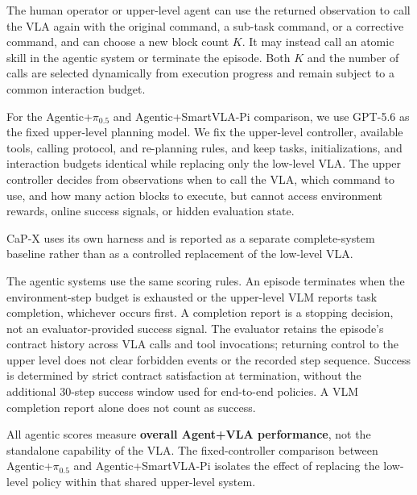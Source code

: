 The human operator or upper-level agent can use the returned observation
to call the VLA again with the original command, a sub-task command, or
a corrective command, and can choose a new block count \(K\). It may
instead call an atomic skill in the agentic system or terminate the
episode. Both \(K\) and the number of calls are selected dynamically
from execution progress and remain subject to a common interaction
budget.

For the Agentic+$\pi_{0.5}$ and Agentic+SmartVLA-Pi comparison, we use GPT-5.6
as the fixed upper-level planning model. We fix the upper-level
controller, available tools, calling protocol, and re-planning rules, and
keep tasks, initializations, and interaction budgets identical while
replacing only the low-level VLA. The upper controller decides from
observations when to call the VLA, which command to use, and how many
action blocks to execute, but cannot access environment rewards, online
success signals, or hidden evaluation state.

CaP-X uses its own harness and is reported as a separate complete-system
baseline rather than as a controlled replacement of the low-level VLA.

The agentic systems use the same scoring rules. An episode terminates when
the environment-step budget is exhausted or the upper-level VLM reports
task completion, whichever occurs first. A completion report is a stopping
decision, not an evaluator-provided success signal. The evaluator retains
the episode's contract history across VLA calls and tool invocations;
returning control to the upper level does not clear forbidden events or
the recorded step sequence. Success is determined by strict contract
satisfaction at termination, without the additional 30-step success window
used for end-to-end policies. A VLM completion report alone does not count
as success.

All agentic scores measure \textbf{overall Agent+VLA performance}, not the
standalone capability of the VLA. The fixed-controller comparison between
Agentic+$\pi_{0.5}$ and Agentic+SmartVLA-Pi isolates the effect of replacing the
low-level policy within that shared upper-level system.

